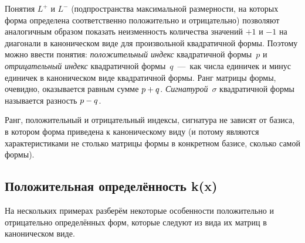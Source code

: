 \documentclass[a4paper,12pt]{article}
\begin{document}
  Понятия $L^{+}$ и $L^{-}$ (подпространства максимальной размерности, на которых форма определена соответственно положительно и отрицательно) позволяют аналогичным образом показать неизменность количества значений $+1$ и $-1$ на диагонали в каноническом виде для произвольной квадратичной формы.
  Поэтому можно ввести понятия: \emph{положительный индекс} квадратичной формы~$p$ и \emph{отрицательный индекс} квадратичной формы~$q$~---~как числа единичек и минус единичек в каноническом виде квадратичной формы.
  Ранг матрицы формы, очевидно, оказывается равным сумме $p \hm+ q$.
  \emph{Сигнатурой}~$\sigma$ квадратичной формы называется разность $p \hm- q$.
  
  \begin{theorem}
    Ранг, положительный и отрицательный индексы, сигнатура не зависят от базиса, в котором форма приведена к каноническому виду (и потому являются характеристиками не столько матрицы формы в конкретном базисе, сколько самой формы).
  \end{theorem}
  
  
  \subsection{Положительная определённость k(x)}
  
  На нескольких примерах разберём некоторые особенности положительно и отрицательно определённых форм, которые следуют из вида их матриц в каноническом виде.
  
\end{document}

